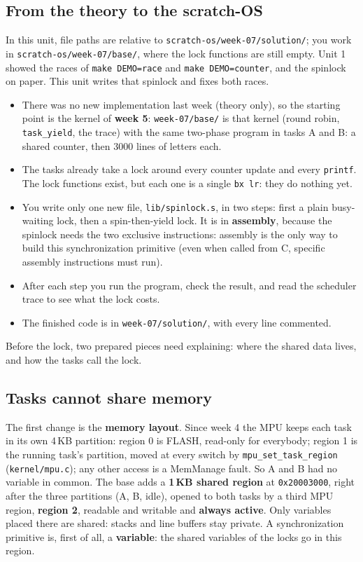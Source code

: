 \subsection{From the theory to the scratch-OS}
In this unit, file paths are relative to \texttt{scratch-os/week-07/solution/}; you work in \texttt{scratch-os/week-07/base/}, where the lock functions are still empty. Unit 1 showed the races of \texttt{make DEMO=race} and \texttt{make DEMO=counter}, and the spinlock on paper. This unit writes that spinlock and fixes both races.
\begin{itemize}
    \item There was no new implementation last week (theory only), so the starting point is the kernel of \textbf{week 5}: \texttt{week-07/base/} is that kernel (round robin, \texttt{task\_yield}, the trace) with the same two-phase program in tasks A and B: a shared counter, then 3000 lines of letters each.
    \item The tasks already take a lock around every counter update and every \texttt{printf}. The lock functions exist, but each one is a single \texttt{bx lr}: they do nothing yet.
    \item You write only one new file, \texttt{lib/spinlock.s}, in two steps: first a plain busy-waiting lock, then a spin-then-yield lock. It is in \textbf{assembly}, because the spinlock needs the two exclusive instructions: assembly is the only way to build this synchronization primitive (even when called from C, specific assembly instructions must run).
    \item After each step you run the program, check the result, and read the scheduler trace to see what the lock costs.
    \item The finished code is in \texttt{week-07/solution/}, with every line commented.
\end{itemize}
Before the lock, two prepared pieces need explaining: where the shared data lives, and how the tasks call the lock.

\subsection{Tasks cannot share memory}
The first change is the \textbf{memory layout}. Since week 4 the MPU keeps each task in its own 4\,KB partition: region 0 is FLASH, read-only for everybody; region 1 is the running task's partition, moved at every switch by \texttt{mpu\_set\_task\_region} (\texttt{kernel/mpu.c}); any other access is a MemManage fault. So A and B had no variable in common. The base adds a \textbf{1\,KB shared region} at \texttt{0x20003000}, right after the three partitions (A, B, idle), opened to both tasks by a third MPU region, \textbf{region 2}, readable and writable and \textbf{always active}. Only variables placed there are shared: stacks and line buffers stay private.
A synchronization primitive is, first of all, a \textbf{variable}: the shared variables of the locks go in this region.

